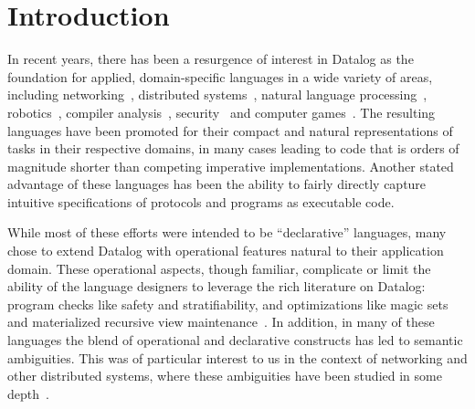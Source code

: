 \section{Introduction}




In recent years, there has been a resurgence of interest in Datalog as the foundation for applied, domain-specific languages in a wide variety of areas, including networking~\cite{Loo2009-CACM}, distributed systems~\cite{Belaramani:2009,Chu:2007}, natural language processing~\cite{Eisner:2004}, robotics~\cite{Ashley-Rollman:2007}, compiler analysis~\cite{Lam:2005}, security~\cite{Li:2003,Zhou:2009} and computer games~\cite{White:2007}.  The resulting languages have been promoted for their compact and natural representations of tasks in their respective domains, in many cases leading to code that is orders of magnitude shorter than competing imperative implementations.  Another stated advantage of these languages has been the ability to fairly directly capture intuitive specifications of protocols and programs as executable code.

While most of these efforts were intended to be ``declarative'' languages, many chose to extend Datalog with operational features natural to their application domain.  These operational aspects, though familiar, complicate or limit the ability of the language designers to leverage the rich literature on Datalog: program checks like safety and stratifiability, and optimizations like magic sets and materialized recursive view maintenance~\cite{deductivesurvey}.  In addition, in many of these languages the blend of operational and declarative constructs has led to semantic ambiguities.  This was of particular interest to us in the context of networking and other distributed systems, where these ambiguities have been studied in some depth~\cite{navarro,Mao2009}.

